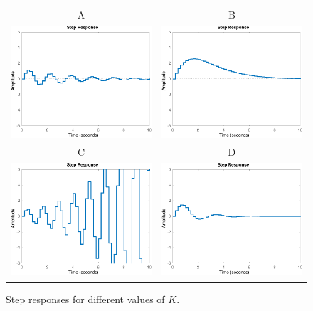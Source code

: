 \documentclass[letter,12pt]{scrartcl}
\begin{document}
\begin{figure}[t]
\begin{center}
\begin{tabular}{cc}
A & B\\
\includegraphics[width=0.4\linewidth]{step-plot-3-crop}
&\includegraphics[width=0.4\linewidth]{step-plot-1-crop}\\
C & D\\
\includegraphics[width=0.4\linewidth]{step-plot-5-crop}
&\includegraphics[width=0.4\linewidth]{step-plot-2-crop}

\end{tabular}
\caption{Step responses for different values of $K$.}
\label{fig:step}
\end{center}
\end{figure}
\end{document}
